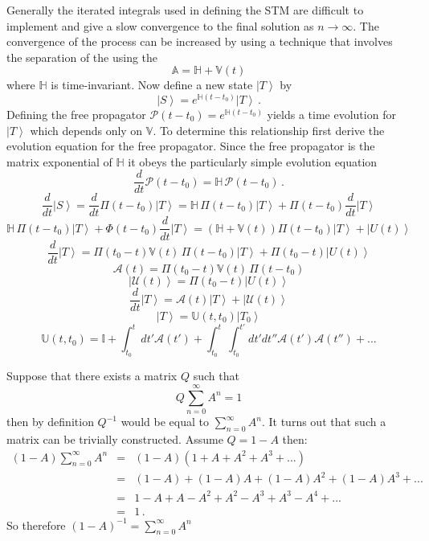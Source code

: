 \documentclass[10pt]{article}
\begin{document}
Generally the iterated integrals used in defining the STM are difficult
to implement and give a slow convergence to the final solution as
$n \rightarrow \infty$.  The convergence of the process can be 
increased by using a technique that involves the separation of the 
using the 
\[
  {\mathbb A} = {\mathbb H} + {\mathbb V}(t)
\]
where ${\mathbb H}$ is time-invariant.  Now define a new state 
$\left| T \right>$ by
\[
  \left| S \right> = e^{ {\mathbb H} (t-t_0) } \left| T \right> \,.
\]
Defining the free propagator 
${\mathcal P}(t-t_0) = e^{ {\mathbb H} (t-t_0) }$ yields a time
evolution for $\left| T \right>$ which depends only on $\mathbb V$. 
To determine this relationship first derive the evolution equation
for the free propagator.  Since the free propagator is the matrix 
exponential of $\mathbb H$ it obeys the particularly simple
evolution equation
\[
  \frac{d}{dt} {\mathcal P}(t-t_0) = {\mathbb H} \, {\mathcal P}(t-t_0) \, .
\]
\[
  \frac{d}{dt} \left| S \right> = \frac{d}{dt} \Pi(t-t_0) \left| T \right> 
                                = {\mathbb H} \, \Pi(t-t_0) \left| T \right> 
                                  + \Pi(t-t_0) \frac{d}{dt} \left| T \right>
\]
\[
  {\mathbb H} \, \Pi(t-t_0) \left| T \right> + \Phi(t-t_0) \frac{d}{dt} \left| T \right>
    = ( {\mathbb H} + {\mathbb V}(t) ) \Pi(t-t_0) \left| T \right> + \left| U(t) \right>
\]
\[
  \frac{d}{dt} \left| T \right> = \Pi(t_0-t) {\mathbb V}(t) \, \Pi(t-t_0) \left| T \right> + \Pi(t_0-t) \left| U(t) \right>
\]
\[
  {\mathcal A}(t) = \Pi(t_0-t) {\mathbb V}(t) \, \Pi(t-t_0)
\]
\[
  \left| {\mathcal U}(t) \right> = \Pi(t_0-t) \left| U(t) \right>
\]
\[
  \frac{d}{dt} \left| T \right> = {\mathcal A}(t) \left| T \right> + \left| {\mathcal U}(t) \right>
\]
\[
  \left| T \right> = {\mathbb U}(t,t_0) \left| T_0 \right>
\]
\[
  {\mathbb U}(t,t_0) =    {\mathbb I} + \int_{t_0}^t dt' {\mathcal A}(t') 
                        + \int_{t_0}^t \int_{t_0}^{t'} dt' dt'' {\mathcal A}(t') {\mathcal A}(t'') + ...
\]


Suppose that there exists a matrix $Q$ such that
\[
  Q \sum_{n=0}^{\infty} A^n = 1
\]
then by definition $Q^{-1}$ would be equal to $\sum_{n=0}^{\infty} A^n$. It 
turns out that such a matrix can be trivially constructed.  Assume 
$Q = 1 - A$ then:
\begin{eqnarray}
  (1-A) \sum_{n=0}^{\infty} A^n 
       & = & (1-A) \left(1 + A + A^2 + A^3 + ... \right) \\
       & = & (1-A) + (1-A)A + (1-A)A^2 + (1-A)A^3 + ...\\
       & = & 1 - A + A - A^2 + A^2 - A^3 + A^3 - A^4 + ... \\
       & = & 1 \, .
\end{eqnarray}
So therefore $(1-A)^{-1} = \sum_{n=0}^{\infty} A^n$
\end{document}

